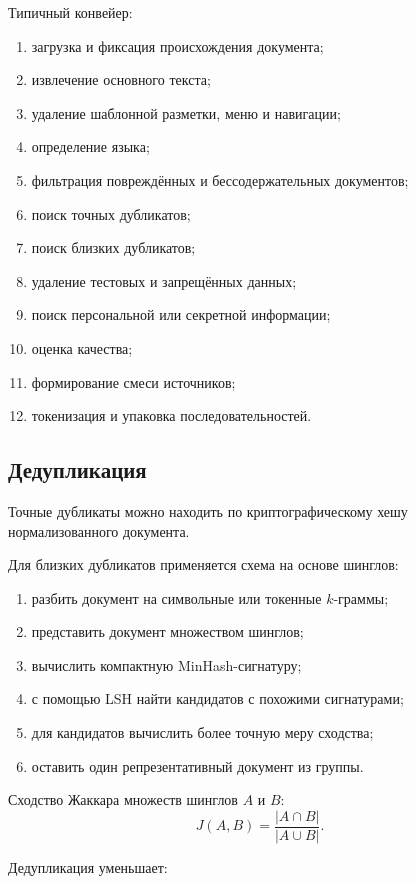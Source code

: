 \documentclass[12pt,a4paper]{article}
\newcommand{\1}{\mathbf{1}}
\theoremstyle{definition}
\theoremstyle{remark}
\begin{document}
Типичный конвейер:

\begin{enumerate}
    \item загрузка и фиксация происхождения документа;
    \item извлечение основного текста;
    \item удаление шаблонной разметки, меню и навигации;
    \item определение языка;
    \item фильтрация повреждённых и бессодержательных документов;
    \item поиск точных дубликатов;
    \item поиск близких дубликатов;
    \item удаление тестовых и запрещённых данных;
    \item поиск персональной или секретной информации;
    \item оценка качества;
    \item формирование смеси источников;
    \item токенизация и упаковка последовательностей.
\end{enumerate}

\subsection{Дедупликация}

Точные дубликаты можно находить по криптографическому хешу
нормализованного документа.

Для близких дубликатов применяется схема на основе шинглов:

\begin{enumerate}
    \item разбить документ на символьные или токенные $k$-граммы;
    \item представить документ множеством шинглов;
    \item вычислить компактную MinHash-сигнатуру;
    \item с помощью LSH найти кандидатов с похожими сигнатурами;
    \item для кандидатов вычислить более точную меру сходства;
    \item оставить один репрезентативный документ из группы.
\end{enumerate}

Сходство Жаккара множеств шинглов $A$ и $B$:
\[
J(A,B)=\frac{|A\cap B|}{|A\cup B|}.
\]

Дедупликация уменьшает:
\end{document}
